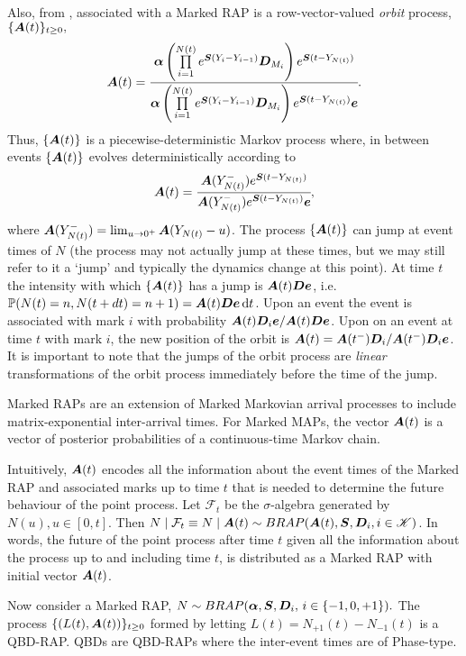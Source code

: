 Also, from \cite{bn2010}, associated with a Marked RAP is a row-vector-valued \emph{orbit} process, \(\{\boldsymbol A(t)\}_{t\geq0},\)
\[\boldsymbol A(t) = \cfrac{\boldsymbol \alpha\left( \prod\limits_{i=1}^{N(t)} e^{\boldsymbol S(Y_{i}-Y_{i-1})}\boldsymbol D_{M_i}\right)e^{\boldsymbol S (t-Y_{N(t)})}}{\boldsymbol \alpha\left( \prod\limits_{i=1}^{N(t)} e^{\boldsymbol S(Y_{i}-Y_{i-1})}\boldsymbol D_{M_i}\right)e^{\boldsymbol S( t-Y_{N(t)})}\boldsymbol e}.\]
Thus, \(\{\boldsymbol A(t)\}\) is a piecewise-deterministic Markov process where, in between events \(\{\boldsymbol A(t)\}\) evolves deterministically according to 
\[\boldsymbol A(t) = \cfrac{\boldsymbol A(Y_{N(t)}^-)e^{\boldsymbol S(t-Y_{N(t)})}}{\boldsymbol A(Y_{N(t)}^-)e^{\boldsymbol S(t-Y_{N(t)})}\boldsymbol e},\]
where \(\boldsymbol A(Y_{N(t)}^-) = \lim_{u\to 0^+}\boldsymbol A(Y_{N(t)}-u)\). The process \(\{\boldsymbol A(t)\}\) can jump at event times of \(N\) (the process may not actually jump at these times, but we may still refer to it a `jump' and typically the dynamics change at this point). At time \(t\) the intensity with which \(\{\boldsymbol A(t)\}\) has a jump is \(\boldsymbol A(t) \boldsymbol D\boldsymbol e\), i.e.~\(\mathbb P(N(t)=n,N(t+dt)=n+1)=\boldsymbol A(t) \boldsymbol D\boldsymbol e\, \mathrm{d} t\). Upon an event the event is associated with mark \(i\) with probability \(\boldsymbol A(t) \boldsymbol D_i\boldsymbol e/\boldsymbol A(t) \boldsymbol D\boldsymbol e\). Upon on an event at time \(t\) with mark \(i\), the new position of the orbit is \(\boldsymbol A(t) = \boldsymbol A(t^-) \boldsymbol D_i/\boldsymbol A(t^-) \boldsymbol D_i\boldsymbol e\). It is important to note that the jumps of the orbit process are \emph{linear} transformations of the orbit process immediately before the time of the jump. 

Marked RAPs are an extension of Marked Markovian arrival processes to include matrix-exponential inter-arrival times. For Marked MAPs, the vector \(\boldsymbol A(t)\) is a vector of posterior probabilities of a continuous-time Markov chain. 

Intuitively, \(\boldsymbol A(t)\) encodes all the information about the event times of the Marked RAP and associated marks up to time \(t\) that is needed to determine the future behaviour of the point process. Let \(\mathcal F_{t}\) be the \(\sigma\)-algebra generated by \(N(u), u\in[0,t]\). Then \(N\mid \mathcal F_t \equiv N\mid \boldsymbol A(t) \sim BRAP(\boldsymbol A(t), \boldsymbol S, \boldsymbol D_i,i\in\mathscr K)\). In words, the future of the point process after time \(t\) given all the information about the process up to and including time \(t\), is distributed as a Marked RAP with initial vector \(\boldsymbol A(t)\). 

Now consider a Marked RAP, \(N\sim BRAP(\boldsymbol \alpha, \boldsymbol S, \boldsymbol D_i,\,i\in\{-1,0,+1\}).\) The process \(\{(L(t),\boldsymbol A(t))\}_{t\geq0}\) formed by letting \(L(t) = N_{+1}(t) - N_{-1}(t)\) is a QBD-RAP. QBDs are QBD-RAPs where the inter-event times are of Phase-type.


